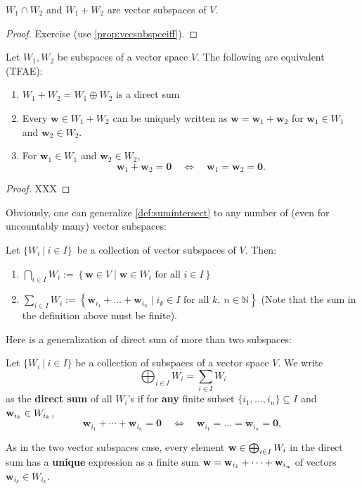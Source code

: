 \begin{proposition}
\(W_1 \cap W_2\) and \(W_1 + W_2\) are vector subspaces of \(V\).
\end{proposition}
\begin{proof}
    Exercise (use \autoref{prop:vecsubspceiff}).
\end{proof}

\begin{proposition}
Let \( W_1, W_2 \) be subspaces of a vector space \( V \). The following are equivalent (TFAE):
\begin{enumerate}
\item $W_1 + W_2 = W_1 \oplus W_2$ is a direct sum
\item Every \( \mathbf{w} \in W_1 + W_2 \) can be uniquely written as $\mathbf{w} = \mathbf{w}_1 + \mathbf{w}_2$ for \( \mathbf{w}_1 \in W_1 \) and \( \mathbf{w}_2 \in W_2 \).
\item For \( \mathbf{w}_1 \in W_1 \) and \( \mathbf{w}_2 \in W_2 \), 
$$\mathbf{w}_1 + \mathbf{w}_2 = \mathbf{0} \quad \Leftrightarrow \quad \mathbf{w}_1 = \mathbf{w}_2 = \mathbf{0}.$$
\end{enumerate}
\end{proposition}

\begin{proof}
    XXX
\end{proof}

Obviously, one can generalize \autoref{def:sumintersect} to any number of (even for uncountably many) vector subspaces:
\begin{definition}
 Let \(\{W_i\ |\ i \in I\}\)\ be a collection of vector subspaces of \(V\). Then:

\begin{enumerate}
  \item \(\bigcap_{i \in I} W_i  := \left\{ \mathbf{w} \in V \mid \mathbf{w} \in W_i \text{ for all } i \in I \right\}\)

  \item \(\sum_{i \in I} W_i  := \left\{ \mathbf{w}_{i_1} + \dots + \mathbf{w}_{i_n} \mid i_k \in I \text{ for all } k,\ n \in \mathbb{N} \right\}\) (Note that the sum in the definition above must be finite).
\end{enumerate}   
\end{definition}
 

Here is a generalization of direct sum of more than two subspaces:
\begin{definition}
 Let \( \{ W_i\ |\ i \in I \} \) be a collection of subspaces of a vector space \( V \). We write
\[
\bigoplus_{i \in I} W_i = \sum_{i \in I} W_i 
\]
as the \textbf{direct sum} of all \( W_i\)'s if for {\bf any} finite subset $\{i_1, \dots, i_n\} \subseteq I$ and ${\bf w}_{i_k} \in W_{i_k}$,
\[
\mathbf{w}_{i_1} + \cdots + \mathbf{w}_{i_n} = \mathbf{0} \quad \Leftrightarrow \quad \mathbf{w}_{i_1} = \dots  = \mathbf{w}_{i_n} = \mathbf{0},
\]

\end{definition}
As in the two vector subspaces case, every element \( {\bf w} \in \bigoplus_{i \in I} W_i\) in the direct sum has a \textbf{unique} expression as a finite sum \( {\bf w} = \mathbf{w}_{i_1} + \cdots + \mathbf{w}_{i_n} \) of vectors \( \mathbf{w}_{i_k} \in W_{i_k} \).


